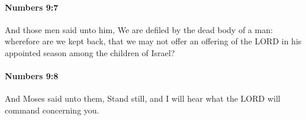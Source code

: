 		\paragraph{Numbers 9:7} %
			\label{NUMBERS-9-7}

			And those men said unto him, We are defiled by the dead body of a man: wherefore are we kept back, that we may not offer an offering of the LORD in his appointed season among the children of Israel?


		\paragraph{Numbers 9:8} %
			\label{NUMBERS-9-8}

			And Moses said unto them, Stand still, and I will hear what the LORD will command concerning you.


